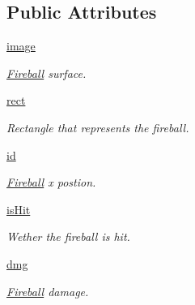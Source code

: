 \subsection*{Public Attributes}
\begin{DoxyCompactItemize}
\item 
\hyperlink{classactor_1_1fireball_1_1_fireball_a5dbeecf7c79f7dd02bd262048b79f908}{image}
\begin{DoxyCompactList}\small\item\em \hyperlink{classactor_1_1fireball_1_1_fireball}{Fireball} surface. \end{DoxyCompactList}\item 
\mbox{\label{classactor_1_1fireball_1_1_fireball_a23e0fa743f75f08f14448d2ab61782e0}} 
\hyperlink{classactor_1_1fireball_1_1_fireball_a23e0fa743f75f08f14448d2ab61782e0}{rect}
\begin{DoxyCompactList}\small\item\em Rectangle that represents the fireball. \end{DoxyCompactList}\item 
\hyperlink{classactor_1_1fireball_1_1_fireball_aeb50a9203c4b4a9d66934feadb95d8c0}{id}
\begin{DoxyCompactList}\small\item\em \hyperlink{classactor_1_1fireball_1_1_fireball}{Fireball} x postion. \end{DoxyCompactList}\item 
\mbox{\label{classactor_1_1fireball_1_1_fireball_a5bb7cb975378011380c177af107bd50f}} 
\hyperlink{classactor_1_1fireball_1_1_fireball_a5bb7cb975378011380c177af107bd50f}{is\+Hit}
\begin{DoxyCompactList}\small\item\em Wether the fireball is hit. \end{DoxyCompactList}\item 
\mbox{\label{classactor_1_1fireball_1_1_fireball_a6210caf7f7eb813b6a2f1b868670af94}} 
\hyperlink{classactor_1_1fireball_1_1_fireball_a6210caf7f7eb813b6a2f1b868670af94}{dmg}
\begin{DoxyCompactList}\small\item\em \hyperlink{classactor_1_1fireball_1_1_fireball}{Fireball} damage. \end{DoxyCompactList}\item 

\end{DoxyCompactItemize}
